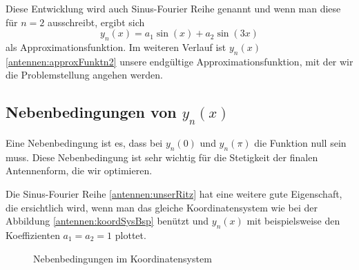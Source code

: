 Diese Entwicklung wird auch Sinus-Fourier Reihe genannt
und wenn man diese für $n=2$ ausschreibt, ergibt sich
\begin{equation}
	y_n(x)
	=
	a_1\sin(x)+a_2\sin(3x)
	\label{antennen:approxFunktn2}
\end{equation}
als Approximationsfunktion. Im weiteren Verlauf ist $y_n(x)$ \eqref{antennen:approxFunktn2} 
unsere endgültige Approximationsfunktion, mit der wir die Problemstellung angehen werden.

\subsection{Nebenbedingungen von $y_n(x)$\label{antennen:nebenbedRitz}}

Eine Nebenbedingung ist es, dass bei $y_n(0)$ und $y_n(\pi)$ die Funktion null sein muss.
Diese Nebenbedingung ist sehr wichtig für die Stetigkeit der finalen Antennenform, die wir optimieren.

Die Sinus-Fourier Reihe \eqref{antennen:unserRitz} hat eine weitere gute Eigenschaft, 
die ersichtlich wird, wenn man das gleiche Koordinatensystem wie bei der Abbildung \ref{antennen:koordSysBsp}
benützt und $y_n(x)$ mit beispielsweise den Koeffizienten $a_1=a_2=1$ plottet.

\begin{figure}
	\centering
	\caption{Nebenbedingungen im Koordinatensystem}
	\label{antennen:nebenbedGrafik}
\end{figure}

